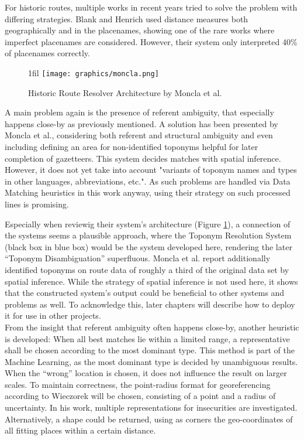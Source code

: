 \documentclass[11pt]{article}
\makeatletter
\newcommand*{\centerfloat}{
  \parindent \z@
  \leftskip \z@ \@plus 1fil \@minus \textwidth
  \rightskip\leftskip
  \parfillskip \z@skip}
\makeatother
\begin{document}
For historic routes, multiple works in recent years tried to solve the problem with differing strategies. Blank and Henrich used distance measures both geographically and in the placenames, showing one of the rare works where imperfect placenames are considered. However, their system only interpreted 40\% of placenames correctly. \cite{blank15}

\begin{figure}[htb!]
  \centerfloat
    \texttt{[image: graphics/moncla.png]}
  \caption{Historic Route Resolver Architecture by Moncla et al. \cite{moncla14}}
  \label{fig:moncla}
\end{figure}

A main problem again is the presence of referent ambiguity, that especially happens close-by as previously mentioned. \cite{brunner08}\cite{buscaldi10} A solution has been presented by Moncla et al., considering both referent and structural ambiguity and even including defining an area for non-identified toponyms helpful for later completion of gazetteers. \cite{moncla14} This system decides matches with spatial inference. However, it does not yet take into account "variants of toponym names and types in other languages, abbreviations, etc.". \cite[p. 191]{moncla14} As such problems are handled via Data Matching heuristics in this work anyway, using their strategy on such processed lines is promising.

Especially when reviewig their system's architecture (Figure \ref{fig:moncla}), a connection of the systems seems a plausible approach, where the Toponym Resolution System (black box in blue box) would be the system developed here, rendering the later ``Toponym Disambiguation'' superfluous. Moncla et al. report additionally identified toponyms on route data of roughly a third of the original data set by spatial inference. While the strategy of spatial inference is not used here, it shows that the constructed system's output could be beneficial to other systems and problems as well. To acknowledge this, later chapters will describe how to deploy it for use in other projects.\\

From the insight that referent ambiguity often happens close-by, another heuristic is developed: When all best matches lie within a limited range, a representative shall be chosen according to the most dominant type. This method is part of the Machine Learning, as the most dominant type is decided by unambiguous results. When the ``wrong'' location is chosen, it does not influence the result on larger scales. To maintain correctness, the point-radius format for georeferencing according to Wieczorek will be chosen, consisting of a point and a radius of uncertainty. \cite{wieczorek04} In his work, multiple representations for insecurities are investigated. Alternatively, a shape could be returned, using as corners the geo-coordinates of all fitting places within a certain distance.\\
\end{document}
